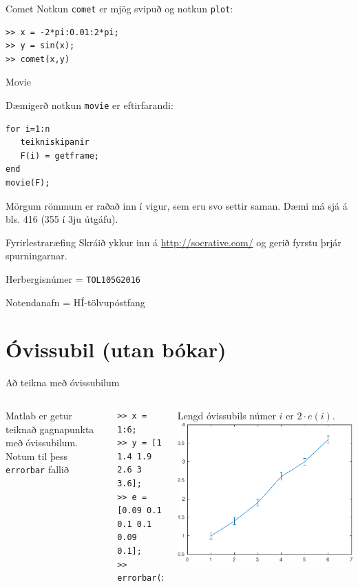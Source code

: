 \documentclass{beamer}
\begin{document}
\begin{frame}[fragile]{Comet}
Notkun \texttt{comet} er mjög svipuð og notkun \texttt{plot}:
\begin{verbatim}
>> x = -2*pi:0.01:2*pi;
>> y = sin(x);
>> comet(x,y)
\end{verbatim}
\end{frame}

\begin{frame}[fragile]{Movie}

Dæmigerð notkun \texttt{movie} er eftirfarandi:
\begin{verbatim}
for i=1:n
   teikniskipanir
   F(i) = getframe;
end
movie(F);
\end{verbatim}
Mörgum römmum er raðað inn í vigur, sem eru svo settir saman. Dæmi má sjá á bls. 416 (355 í 3ju útgáfu).

\end{frame}

\begin{frame}[fragile]{Fyrirlestraræfing}
Skráið ykkur inn á \url{http://socrative.com/} og gerið fyrstu þrjár spurningarnar.

Herbergisnúmer = \texttt{TOL105G2016}

Notendanafn = HÍ-tölvupóstfang
\end{frame}

\section{Óvissubil (utan bókar)}

\begin{frame}[fragile]{Að teikna með óvissubilum}
\begin{columns}
Matlab er getur teiknað gagnapunkta með óvissubilum. Notum til þess \texttt{errorbar} fallið
\begin{verbatim}
>> x = 1:6;
>> y = [1 1.4 1.9 2.6 3 3.6];
>> e = [0.09 0.1 0.1 0.1 0.09 0.1];
>> errorbar(x,y,e)
\end{verbatim}
Lengd óvissubils númer $i$ er $2\cdot e(i)$.
\includegraphics[width=\textwidth]{Pics/simple-errorbar}
\end{columns}
\end{frame}
\end{document}
